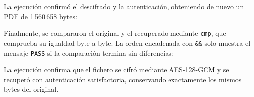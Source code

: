 \begingroup
\renewcommand{\lstlistingname}{Script}

\endgroup

La ejecución confirmó el descifrado y la autenticación, obteniendo de nuevo un PDF de 1\,560\,658 bytes:

\noindent\begin{minipage}{\linewidth}
\begingroup
\renewcommand{\lstlistingname}{Salida y verificación}

\endgroup
\end{minipage}

Finalmente, se compararon el original y el recuperado mediante \texttt{cmp}, que comprueba su igualdad byte a byte. La orden encadenada con \texttt{\&\&} solo muestra el mensaje \texttt{PASS} si la comparación termina sin diferencias:

\noindent\begin{minipage}{\linewidth}
\begingroup
\renewcommand{\lstlistingname}{Salida y verificación}

\endgroup
\end{minipage}

La ejecución confirma que el fichero se cifró mediante AES-128-GCM y se recuperó con autenticación satisfactoria, conservando exactamente los mismos bytes del original.

